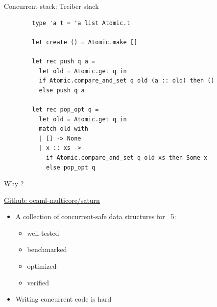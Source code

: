 \begin{frame}[fragile]{Concurrent stack: Treiber stack}     
    \begin{lstlisting}
        type 'a t = 'a list Atomic.t

        let create () = Atomic.make []
      
        let rec push q a =
          let old = Atomic.get q in
          if Atomic.compare_and_set q old (a :: old) then ()
          else push q a
      
        let rec pop_opt q =
          let old = Atomic.get q in
          match old with
          | [] -> None
          | x :: xs -> 
            if Atomic.compare_and_set q old xs then Some x 
            else pop_opt q
    \end{lstlisting}
\end{frame}

\begin{frame}{Why \Saturn ?}
    \hfill\small{\href{https://github.com/ocaml-multicore/saturn}{Github: ocaml-multicore/saturn}
\vfill
    \begin{itemize}[label=$\bullet$]
        \item A collection of concurrent-safe data structures for \OCaml~5: 
        \begin{itemize}[label=$\diamond$]
            \item well-tested
            \item benchmarked
            \item optimized
            \item verified
        \end{itemize}
        \item Writing concurrent code is hard 
    \end{itemize}
    }
    \vfill
\end{frame}


